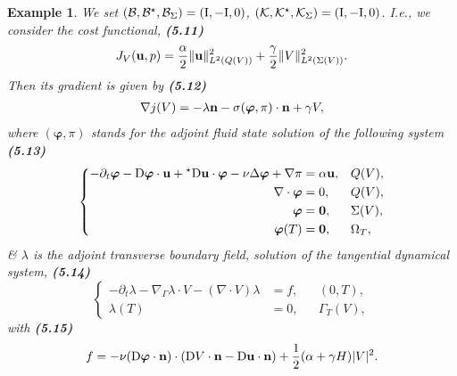 \documentclass[oneside]{book}
\numberwithin{equation}{section}
\newtheorem{example}{Example}[chapter]
\begin{document}
\begin{example}
	We set $(\mathcal{B},\mathcal{B}^\star,\mathcal{B}_\Sigma) = ({\rm I},-{\rm I},0)$, $(\mathcal{K},\mathcal{K}^\star,\mathcal{K}_\Sigma) = ({\rm I},-{\rm I},0)$. I.e., we consider the cost functional, \textbf{(5.11)}
	\begin{align*}
		J_V({\bf u},p) = \frac{\alpha}{2}\|{\bf u}\|_{L^2(Q(V))}^2 + \frac{\gamma}{2}\|V\|_{L^2(\Sigma(V))}^2.
	\end{align*}
	Then its gradient is given by \textbf{(5.12)}
	\begin{align*}
		\nabla j(V) = -\lambda{\bf n} - \sigma(\boldsymbol{\varphi},\pi)\cdot{\bf n} + \gamma V,
	\end{align*}
	where $(\boldsymbol{\varphi},\pi)$ stands for the adjoint fluid state solution of the following system \textbf{(5.13)}
	\begin{equation*}
		\left\{\begin{split}
			-\partial_t\boldsymbol{\varphi} - {\rm D}\boldsymbol{\varphi}\cdot{\bf u} + {}^\star{\rm D}{\bf u}\cdot\boldsymbol{\varphi} - \nu\Delta\boldsymbol{\varphi} + \nabla\pi &= \alpha{\bf u},&&Q(V),\\
			\nabla\cdot\boldsymbol{\varphi} &= 0,&&Q(V),\\
			\boldsymbol{\varphi} &= {\bf 0},&&\Sigma(V),\\
			\boldsymbol{\varphi}(T) &= {\bf 0},&&\Omega_T,
		\end{split}\right.
	\end{equation*}
	\& $\lambda$ is the adjoint transverse boundary field, solution of the tangential dynamical system, \textbf{(5.14)}
	\begin{equation*}
		\left\{\begin{split}
			-\partial_t\lambda - \nabla_\Gamma\lambda\cdot V - (\nabla\cdot V)\lambda &= f,&&(0,T),\\
			\lambda(T) &= 0,&&\Gamma_T(V),
		\end{split}\right.
	\end{equation*}
	with \textbf{(5.15)}
	\begin{align*}
		f = -\nu({\rm D}\boldsymbol{\varphi}\cdot{\bf n})\cdot({\rm D}V\cdot{\bf n} - {\rm D}{\bf u}\cdot{\bf n}) + \frac{1}{2}(\alpha + \gamma H)|V|^2.
	\end{align*}
\end{example}
\end{document}
